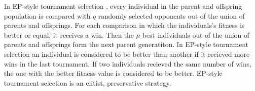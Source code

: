 In EP-style tournament selection \cite{fogel:95}, every individual in
the parent and offspring population is compared with $q$ randomly
selected opponents out of the union of parents and offsprings. For
each comparison in which the individuals's fitness is better or equal,
it receives a win.  Then the $\mu$ best individuals out of the union
of parents and offsprings form the next parent generatiton.  In
EP-style tournament selection an individual is considered to be better
than another if it recieved more wins in the last tournament. If two
individuals recieved the same number of wins, the one with the better
fitness value is considered to be better.  EP-style tournament
selection is an elitist, preservative strategy.


















